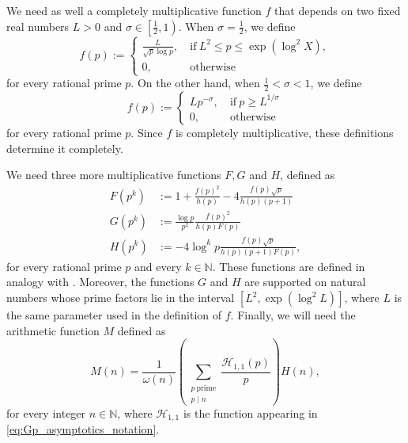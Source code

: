 \documentclass[10pt,a4paper]{amsart}
\def\CalH{{\mathcal{H}}}
\theoremstyle{plain}
\theoremstyle{definition}
\theoremstyle{remark}
\begin{document}
We need as well a completely multiplicative function $f$ that depends on two fixed real numbers $L > 0$ and $\sigma \in \left[\frac{1}{2},1 \right)$. When $\sigma = \frac{1}{2}$, we define
\begin{equation} \label{eq:f_center}
    f(p) := \begin{cases}
        \frac{L}{\sqrt{p} \log p}, \ &\text{if} \ L^2 \leq p \leq \exp(\log^2X), \\
        0, \ &\text{otherwise}
    \end{cases}
\end{equation}
for every rational prime $p$. On the other hand, when $\frac{1}{2} < \sigma < 1$, we define
\begin{equation} \label{eq:f_right}
    f(p) := \begin{cases}
        L p^{-\sigma}, \ &\text{if} \ p \geq L^{1/\sigma} \\
        0, \ &\text{otherwise}
    \end{cases}
\end{equation}
for every rational prime $p$. Since $f$ is completely multiplicative, these definitions determine it completely.

We need three more multiplicative functions $F, G$ and $H$, defined as
\begin{align}
    F(p^k) &:= 1+\frac{f(p)^2}{h(p)}-4\frac{f(p) \sqrt{p}}{h(p) (p+1)} \label{eq:F} \\
    G(p^k) &:= \frac{\log p}{p^{2}}\frac{f(p)^2}{h(p)F(p)} \label{eq:G} \\
    H(p^k) &:= -4 \log^k p\frac{f(p)\sqrt{p}}{h(p) (p+1) F(p)} \label{eq:H},
\end{align}
for every rational prime $p$ and every $k \in \mathbb{N}$. 
These functions are defined in analogy with \cite[page 481]{Soundararajan_2008}. Moreover, the functions $G$ and $H$ are supported on natural numbers whose prime factors lie in the interval $[L^2,\exp(\log^2L)]$, where $L$ is the same parameter used in the definition of $f$. Finally, we will need the arithmetic function $M$ defined as
\begin{equation} \label{eq:M}
    M(n)=\frac{1}{\omega(n)}\left(\sum_{\substack{p \ \text{prime} \\ p \mid n}}\frac{\CalH_{1,1}(p)}{p}\right) H(n),
\end{equation}
for every integer $n \in \mathbb{N}$, where $\mathcal{H}_{1,1}$ is the function appearing in \eqref{eq:Gp_asymptotics_notation}.
\end{document}
